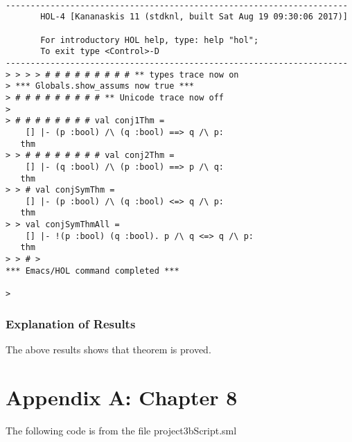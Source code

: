 \documentclass{report}
\begin{document}
\setcounter{sessioncount}{0}
\begin{session}
  \begin{scriptsize}
\begin{verbatim}

---------------------------------------------------------------------
       HOL-4 [Kananaskis 11 (stdknl, built Sat Aug 19 09:30:06 2017)]

       For introductory HOL help, type: help "hol";
       To exit type <Control>-D
---------------------------------------------------------------------
> > > > # # # # # # # # # ** types trace now on
> *** Globals.show_assums now true ***
> # # # # # # # # # ** Unicode trace now off
> 
> # # # # # # # # val conj1Thm =
    [] |- (p :bool) /\ (q :bool) ==> q /\ p:
   thm
> > # # # # # # # # val conj2Thm =
    [] |- (q :bool) /\ (p :bool) ==> p /\ q:
   thm
> > # val conjSymThm =
    [] |- (p :bool) /\ (q :bool) <=> q /\ p:
   thm
> > val conjSymThmAll =
    [] |- !(p :bool) (q :bool). p /\ q <=> q /\ p:
   thm
> > # > 
*** Emacs/HOL command completed ***

> 
\end{verbatim}
  \end{scriptsize}
\end{session}

\subsection{Explanation of Results}
\label{sec:explanation-results-1}
The above results shows that theorem is proved.

\chapter{Appendix A: Chapter 8}
\label{cha:appendix-a:chapter8}

The following code is from the file project3bScript.sml

\end{document}
